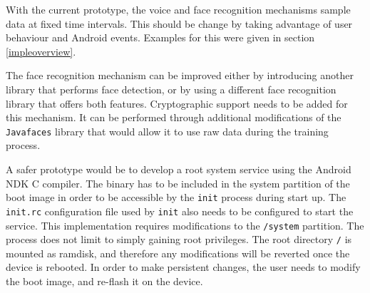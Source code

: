 With the current prototype, the voice and face recognition mechanisms sample data at fixed time intervals. This should be change by taking advantage of user behaviour and Android events. Examples for this were given in section \ref{impleoverview}. 

The face recognition mechanism can be improved either by introducing another library that performs face detection, or by using a different face recognition library that offers both features. Cryptographic support needs to be added for this mechanism.  It can be performed through additional modifications of the {\tt Javafaces} library that would allow it to use raw data during the training process.

A safer prototype would be to develop a root system service using the Android NDK C compiler. The binary has to be included in the system partition of the boot image in order to be accessible by the {\tt init} process during start up. The {\tt init.rc} configuration file used by {\tt init} also needs to be configured to start the service. This implementation requires modifications to the {\tt /system} partition. The process does not limit to simply gaining root privileges. The root directory {\tt /} is mounted as ramdisk, and therefore any modifications will be reverted once the device is rebooted. In order to make persistent changes, the user needs to modify the boot image, and re-flash it on the device.
